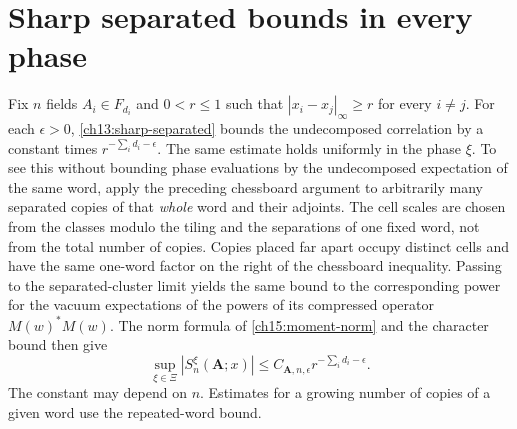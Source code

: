 \section{Sharp separated bounds in every phase}
\label{ch15:sharp-phase-section}

Fix $n$ fields $A_i\in F_{d_i}$ and $0<r\le1$ such that
$|x_i-x_j|_\infty\ge r$ for every $i\ne j$. For each $\epsilon>0$,
\eqref{ch13:sharp-separated} bounds the undecomposed correlation by a constant
times $r^{-\sum_i d_i-\epsilon}$. The same estimate holds uniformly
in the phase $\xi$. To see this without
bounding phase evaluations by the undecomposed expectation of the same word,
apply the preceding chessboard argument to arbitrarily many separated
copies of that \emph{whole} word and their adjoints. The cell scales are
chosen from the classes modulo the tiling and the separations of one fixed word, not
from the total number of copies. Copies placed far apart occupy distinct
cells and have the same one-word factor on the right of the chessboard
inequality. Passing to the separated-cluster limit yields the same
bound to the corresponding power for the vacuum expectations of the powers of its compressed
operator $M(w)^*M(w)$. The norm formula of
\eqref{ch15:moment-norm} and the character bound then give
\begin{equation}
 \sup_{\xi\in\Xi}|S_n^\xi(\boldsymbol A;x)|
      \le C_{\boldsymbol A,n,\epsilon}r^{-\sum_i d_i-\epsilon}.
 \label{ch13:sharp-phase}
\end{equation}
The constant may depend on $n$. Estimates for a growing number of
copies of a given word use the repeated-word bound.
